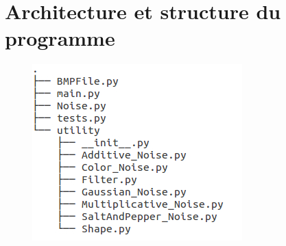 \documentclass{article}
\begin{document}
		
		\section{Architecture et structure du programme}
		
			\begin{figure}[!ht]
				\centering
				\includegraphics{fileTree.jpg}
			\end{figure}
		
\end{document}
